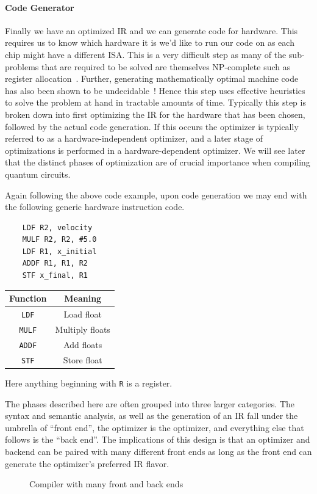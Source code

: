 \paragraph{Code Generator}
Finally we have an optimized \ac{IR} and we can generate code for hardware.
This requires us to know which hardware it is we'd like to run our code on as each chip might have a different \ac{ISA}.
This is a very difficult step as many of the sub-problems that are required to be solved are themselves NP-complete such as register allocation~\cite{register-allocation-NP}. %
Further, generating mathematically optimal machine code has also been shown to be undecidable~\cite{dragonbook}!
Hence this step uses effective heuristics to solve the problem at hand in tractable amounts of time.
Typically this step is broken down into first optimizing the \ac{IR} for the hardware that has been chosen, followed by the actual code generation.
If this occurs the optimizer is typically referred to as a hardware-independent optimizer, and a later stage of optimizations is performed in a hardware-dependent optimizer.
We will see later that the distinct phases of optimization are of crucial importance when compiling quantum circuits.

Again following the above code example, upon code generation we may end with the following generic hardware instruction code.

\begin{minipage}{0.5\textwidth}
    \begin{lstlisting}
    LDF R2, velocity
    MULF R2, R2, #5.0
    LDF R1, x_initial
    ADDF R1, R1, R2
    STF x_final, R1
\end{lstlisting}
\end{minipage}
\begin{minipage}{0.5\textwidth}
    \centering
    \begin{tabular}{cc}
        Function      & Meaning         \\ \toprule
        \texttt{LDF}  & Load float      \\
        \texttt{MULF} & Multiply floats \\
        \texttt{ADDF} & Add floats      \\
        \texttt{STF}  & Store float
    \end{tabular}
    \label{fig:machcode}
\end{minipage}
Here anything beginning with \texttt{R} is a register.

The phases described here are often grouped into three larger categories.
The syntax and semantic analysis, as well as the generation of an \ac{IR} fall under the umbrella of ``front end'', the optimizer is the optimizer, and everything else that follows is the ``back end''.
The implications of this design is that an optimizer and backend can be paired with many different front ends as long as the front end can generate the optimizer's preferred \ac{IR} flavor.
\begin{figure}[ht]
    \centering
    
    \caption{Compiler with many front and back ends}\label{fig:compends}
\end{figure}

